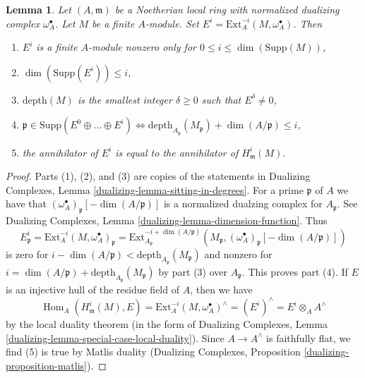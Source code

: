 \documentclass{stacks-project}
\theoremstyle{plain}
\newtheorem{lemma}[subsection]{Lemma}
\theoremstyle{definition}
\theoremstyle{remark}
\numberwithin{equation}{subsection}
\def\Hom{\mathop{\mathrm{Hom}}\nolimits}
\begin{document}
\begin{lemma}
\label{lemma-sitting-in-degrees}
Let $(A, \mathfrak m)$ be a Noetherian local ring with
normalized dualizing complex $\omega_A^\bullet$.
Let $M$ be a finite $A$-module.
Set $E^i = \text{Ext}_A^{-i}(M, \omega_A^\bullet)$.
Then
\begin{enumerate}
\item $E^i$ is a finite $A$-module nonzero only for
$0 \leq i \leq \dim(\text{Supp}(M))$,
\item $\dim(\text{Supp}(E^i)) \leq i$,
\item $\text{depth}(M)$ is the smallest integer $\delta \geq 0$ such that
$E^\delta \not = 0$,
\item $\mathfrak p \in \text{Supp}(E^0 \oplus \ldots \oplus E^i)
\Leftrightarrow
\text{depth}_{A_\mathfrak p}(M_\mathfrak p) + \dim(A/\mathfrak p) \leq i$,
\item the annihilator of $E^i$ is equal to the annihilator
of $H^i_\mathfrak m(M)$.
\end{enumerate}
\end{lemma}

\begin{proof}
Parts (1), (2), and (3) are copies of the statements in
Dualizing Complexes, Lemma \ref{dualizing-lemma-sitting-in-degrees}.
For a prime $\mathfrak p$ of $A$ we have that
$(\omega_A^\bullet)_\mathfrak p[-\dim(A/\mathfrak p)]$
is a normalized dualzing complex for $A_\mathfrak p$.
See Dualizing Complexes, Lemma \ref{dualizing-lemma-dimension-function}.
Thus
$$
E^i_\mathfrak p =
\text{Ext}^{-i}_A(M, \omega_A^\bullet)_\mathfrak p =
\text{Ext}^{-i + \dim(A/\mathfrak p)}_{A_\mathfrak p}
(M_\mathfrak p, (\omega_A^\bullet)_\mathfrak p[-\dim(A/\mathfrak p)])
$$
is zero for
$i - \dim(A/\mathfrak p) < \text{depth}_{A_\mathfrak p}(M_\mathfrak p)$
and nonzero for
$i = \dim(A/\mathfrak p) + \text{depth}_{A_\mathfrak p}(M_\mathfrak p)$
by part (3) over $A_\mathfrak p$.
This proves part (4).
If $E$ is an injective hull of the residue field of $A$, then we have
$$
\Hom_A(H^i_\mathfrak m(M), E) =
\text{Ext}^{-i}_A(M, \omega_A^\bullet)^\wedge =
(E^i)^\wedge =
E^i \otimes_A A^\wedge
$$
by the local duality theorem (in the form of
Dualizing Complexes, Lemma \ref{dualizing-lemma-special-case-local-duality}).
Since $A \to A^\wedge$ is faithfully flat, we find (5) is true by
Matlis duality
(Dualizing Complexes, Proposition \ref{dualizing-proposition-matlis}).
\end{proof}
\end{document}
